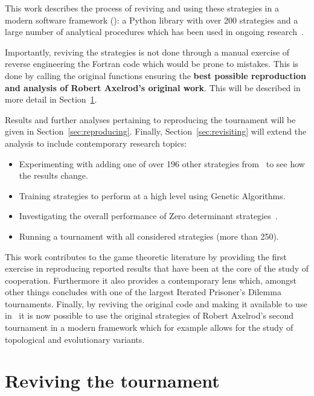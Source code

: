 \documentclass{article}
\begin{document}
This work describes the process of reviving and using these strategies in a
modern software framework (\cite{AxelrodProject}): a Python library with over
200 strategies and a large number of analytical procedures which has been used
in ongoing research~\cite{Harper2017, Knight2017}.

Importantly, reviving the strategies is not done
through a manual exercise of reverse engineering the Fortran code which would be
prone to mistakes. This is done by calling the original functions ensuring the
\textbf{best possible reproduction and analysis of Robert Axelrod's original
work}. This will be described in more detail in Section~\ref{sec:reviving}.

Results and further analyses pertaining to reproducing the tournament will be
given in Section~\ref{sec:reproducing}. Finally, Section~\ref{sec:revisiting}
will extend the analysis to include contemporary research topics:

\begin{itemize}
    \item Experimenting with adding one of over 196 other strategies
        from~\cite{AxelrodProject} to see how the results change.
    \item Training strategies to perform at a high level using Genetic Algorithms.
    \item Investigating the overall performance of Zero determinant
        strategies~\cite{Press2012}.
    \item Running a tournament with all considered strategies (more than 250).
\end{itemize}

This work contributes to the game theoretic literature by providing the first
exercise in reproducing reported results that have been at the core of the study
of cooperation. Furthermore it also provides a contemporary lens which, amongst
other things concludes with one of the largest Iterated Prisoner's Dilemma
tournaments.
Finally, by reviving the original code and making it available to use
in~\cite{AxelrodProject} it is now possible to use the original strategies of
Robert Axelrod's second tournament in a modern framework which for example
allows for the study of topological and evolutionary variants.

\section{Reviving the tournament}\label{sec:reviving}
\end{document}

